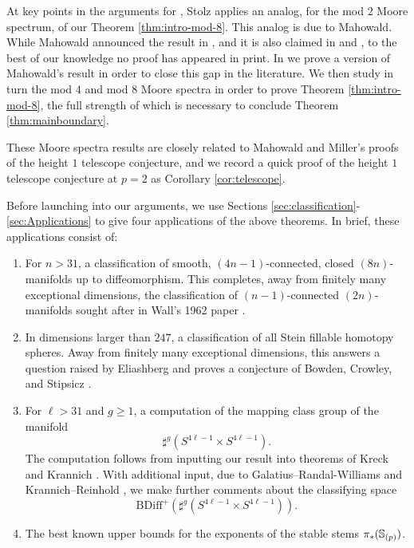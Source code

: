 \begin{rmk}
At key points in the arguments for \cite[Theorems B \& D]{StolzBook}, Stolz applies an analog, for the mod $2$ Moore spectrum, of our Theorem \ref{thm:intro-mod-8}.
This analog is due to Mahowald.
While Mahowald announced the result in \cite{MahBull}, and it is also claimed in \cite{MahTokyo} and \cite[p.41]{DM3}, to the best of our knowledge no proof has appeared in print.  In  we prove a version of Mahowald's result in order to close this gap in the literature.  We then study in turn the mod $4$ and mod $8$ Moore spectra in order to prove Theorem \ref{thm:intro-mod-8}, the full strength of which is necessary to conclude Theorem \ref{thm:mainboundary}.

These Moore spectra results are closely related to Mahowald and Miller's proofs \cite{Miller, MahJEHP} of the height $1$ telescope conjecture, and we record a quick proof of the height $1$ telescope conjecture at $p=2$ as Corollary \ref{cor:telescope}.
\end{rmk}

Before launching into our arguments, we use Sections \ref{sec:classification}-\ref{sec:Applications} to give four applications of the above theorems.  In brief, these applications consist of:
\begin{enumerate}
\item For $n>31$, a classification of smooth, $(4n-1)$-connected, closed $(8n)$-manifolds up to diffeomorphism.  This completes, away from finitely many exceptional dimensions, the classification of $(n-1)$-connected $(2n)$-manifolds sought after in Wall's 1962 paper \cite{Wall62}.

\item In dimensions larger than $247$, a classification of all Stein fillable homotopy spheres.  Away from finitely many exceptional dimensions, this answers a question raised by Eliashberg \cite[3.8]{ContactWorkshop} and proves a conjecture of Bowden, Crowley, and Stipsicz \cite[Conjecture 5.9]{SteinFillable}.

\item For $\ell>31$ and $g \ge 1$, a computation of the mapping class group of the manifold
$$\sharp^{g} \left(S^{4\ell-1} \times S^{4\ell-1} \right).$$
The computation follows from inputting our result into theorems of Kreck and Krannich \cite{Kreck,KrannichMappingClass}.  With additional input, due to Galatius--Randal-Williams and Krannich--Reinhold \cite{GRAbelianQuotients,KrannichCharacteristic}, we make further comments about the classifying space
$$\mathrm{BDiff}^+\left(\sharp^{g} \left(S^{4\ell-1} \times S^{4\ell-1} \right) \right).$$

\item The best known upper bounds for the exponents of the stable stems $\pi_{*}(\operatorname{\mathbb{S}}_{(p)})$.
\end{enumerate}

